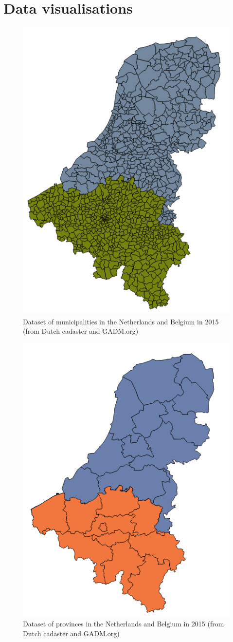 
\chapter{Data visualisations}
\label{app:Data}

\begin{figure}[!h]
	\centering
	\includegraphics[width=0.5\linewidth]{figs/Municipalities.png}
	\caption{Dataset of municipalities in the Netherlands and Belgium in 2015 (from Dutch cadaster and GADM.org)}
	\label{fig:municipalities}
\end{figure}

\begin{figure}[!h]
	\centering
	\includegraphics[width=0.5\linewidth]{figs/Provinces.png}
	\caption{Dataset of provinces in the Netherlands and Belgium in 2015 (from Dutch cadaster and GADM.org)}
	\label{fig:provinces}
\end{figure}

